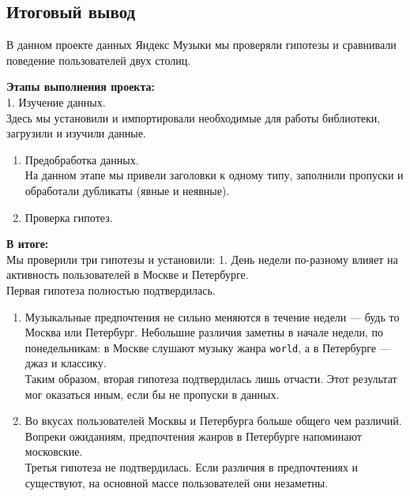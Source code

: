 \documentclass[11pt]{article}
\begin{document}
    \hypertarget{ux438ux442ux43eux433ux43eux432ux44bux439-ux432ux44bux432ux43eux434}{%
\subsection{Итоговый
вывод}\label{ux438ux442ux43eux433ux43eux432ux44bux439-ux432ux44bux432ux43eux434}}

    В данном проекте данных Яндекс Музыки мы проверяли гипотезы и сравнивали
поведение пользователей двух столиц.

\textbf{Этапы выполнения проекта:}\\
1. Изучение данных.\\
Здесь мы установили и импортировали необходимые для работы библиотеки,
загрузили и изучили данные.

\begin{enumerate}
\def\labelenumi{\arabic{enumi}.}
\setcounter{enumi}{1}
\item
  Предобработка данных.\\
  На данном этапе мы привели заголовки к одному типу, заполнили пропуски
  и обработали дубликаты (явные и неявные).
\item
  Проверка гипотез.
\end{enumerate}

\textbf{В итоге:}\\
Мы проверили три гипотезы и установили: 1. День недели по-разному влияет
на активность пользователей в Москве и Петербурге.\\
Первая гипотеза полностью подтвердилась.

\begin{enumerate}
\def\labelenumi{\arabic{enumi}.}
\setcounter{enumi}{1}
\item
  Музыкальные предпочтения не сильно меняются в течение недели --- будь
  то Москва или Петербург. Небольшие различия заметны в начале недели,
  по понедельникам: в Москве слушают музыку жанра \texttt{world}, а в
  Петербурге --- джаз и классику.\\
  Таким образом, вторая гипотеза подтвердилась лишь отчасти. Этот
  результат мог оказаться иным, если бы не пропуски в данных.
\item
  Во вкусах пользователей Москвы и Петербурга больше общего чем
  различий. Вопреки ожиданиям, предпочтения жанров в Петербурге
  напоминают московские.\\
  Третья гипотеза не подтвердилась. Если различия в предпочтениях и
  существуют, на основной массе пользователей они незаметны.
\end{enumerate}


    
    
    
\end{document}
